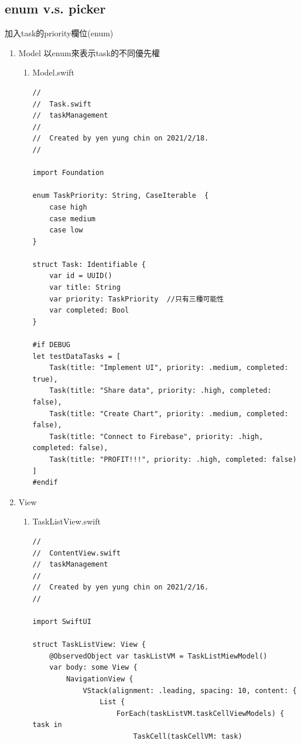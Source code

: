 \documentclass[a4paper,12pt]{article}
\begin{document}
\subsection{enum v.s. picker}
\label{sec:org3e93145}
加入task的priority欄位(enum)\\
\begin{enumerate}
\item Model
\label{sec:orgd23b982}
以enum來表示task的不同優先權\\
\begin{enumerate}
\item Model.swift
\label{sec:org83e9fb6}
\lstset{breaklines=true,language=swift,label= ,caption= ,captionpos=b,firstnumber=1,numbers=left}
\begin{lstlisting}
//
//  Task.swift
//  taskManagement
//
//  Created by yen yung chin on 2021/2/18.
//

import Foundation

enum TaskPriority: String, CaseIterable  {
    case high
    case medium
    case low
}

struct Task: Identifiable {
    var id = UUID()
    var title: String
    var priority: TaskPriority  //只有三種可能性
    var completed: Bool
}

#if DEBUG
let testDataTasks = [
    Task(title: "Implement UI", priority: .medium, completed: true),
    Task(title: "Share data", priority: .high, completed: false),
    Task(title: "Create Chart", priority: .medium, completed: false),
    Task(title: "Connect to Firebase", priority: .high, completed: false),
    Task(title: "PROFIT!!!", priority: .high, completed: false)
]
#endif

\end{lstlisting}
\end{enumerate}
\item View
\label{sec:org739282d}

\begin{enumerate}
\item TaskListView.swift
\label{sec:org6f5b70b}
\lstset{breaklines=true,language=swift,label= ,caption= ,captionpos=b,firstnumber=1,numbers=left}
\begin{lstlisting}
//
//  ContentView.swift
//  taskManagement
//
//  Created by yen yung chin on 2021/2/16.
//

import SwiftUI

struct TaskListView: View {
    @ObservedObject var taskListVM = TaskListMiewModel()
    var body: some View {
        NavigationView {
            VStack(alignment: .leading, spacing: 10, content: {
                List {
                    ForEach(taskListVM.taskCellViewModels) { task in
                        TaskCell(taskCellVM: task)


\end{lstlisting}
\end{enumerate}
\end{enumerate}
\end{document}
